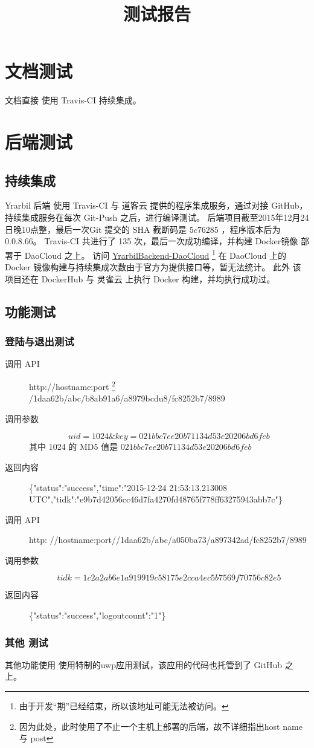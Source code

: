 \documentclass[UTF8]{report}
\title{测试报告}
\begin{document}
    \maketitle
    
    \tableofcontents
    \chapter{文档测试}
    文档直接 使用 Travis-CI 持续集成。
    \chapter{后端测试}
    \section{持续集成}
    Yrarbil 后端 使用 Travis-CI 与 道客云 提供的程序集成服务，通过对接 GitHub，持续集成服务在每次 Git-Push 之后，进行编译测试。
    后端项目截至2015年12月24日晚10点整，最后一次Git 提交的 SHA 截断码是 $5c76285$ ，程序版本后为 0.0.8.66。
    Travis-CI 共进行了 135 次，最后一次成功编译，并构建 Docker镜像 部署于 DaoCloud 之上。
    访问 \href{http://qinka-yrarbilbackend.daoapp.io}{YrarbilBackend-DaoCloud} 
    \footnote{由于开发“期”已经结束，所以该地址可能无法被访问。}
    在 DaoCloud 上的 Docker 镜像构建与持续集成次数由于官方为提供接口等，暂无法统计。
    此外 该项目还在 DockerHub 与 灵雀云 上执行 Docker 构建，并均执行成功过。
    \section{功能测试}
    \subsection{登陆与退出测试}
    \begin{description}
        \item[调用 API] http://hostname:port
        \footnote{因为此处，此时使用了不止一个主机上部署的后端，故不详细指出host name 与 post }
        /1daa62b/abc/b8ab91a6/a8979bcdu8/fc8252b7/8989
        \item[调用参数] $$uid=1024\&key=021bbc7ee20b71134d53e20206bd6feb$$
        其中 1024 的 MD5 值是 $021bbc7ee20b71134d53e20206bd6feb$
        \item[返回内容] \{"status":"success","time":"2015-12-24 21:53:13.213008 UTC","tidk":"e9b7d42056cc46d7fa4270fd48765f778ff63275943abb7c"\}        
    \end{description}
    \begin{description}
        \item[调用 API]
        http:       //hostname:port//1daa62b/abc/a050ba73/a897342ad/fc8252b7/8989
        \item[调用参数] $$tidk=1c2a2ab6e1a919919c58175e2cca4ec5b7569f70756c82e5$$
        \item[返回内容] \{"status":"success","logoutcount":"1"\}
    \end{description}
    \subsection{其他 测试}
    其他功能使用 使用特制的uwp应用测试，该应用的代码也托管到了 GitHub 之上。
\end{document}
